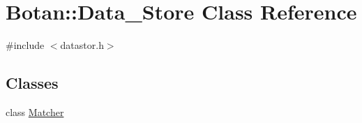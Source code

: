 \hypertarget{classBotan_1_1Data__Store}{\section{Botan\-:\-:Data\-\_\-\-Store Class Reference}
\label{classBotan_1_1Data__Store}
}


{\ttfamily \#include $<$datastor.\-h$>$}

\subsection*{Classes}
\begin{DoxyCompactItemize}
\item 
class \hyperlink{classBotan_1_1Data__Store_1_1Matcher}{Matcher}
\end{DoxyCompactItemize}

